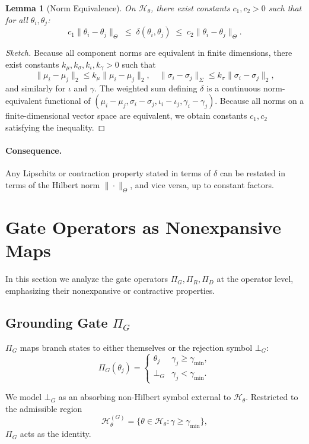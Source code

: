 \documentclass[11pt, a4paper]{article}
\newtheorem{lemma}[theorem]{Lemma}
\begin{document}
\begin{lemma}[Norm Equivalence]
On $\mathcal{H}_\theta$, there exist constants $c_1,c_2 > 0$ such that for all $\theta_i,\theta_j$:
\[
c_1 \|\theta_i-\theta_j\|_{\Theta}
\;\le\;
\delta(\theta_i,\theta_j)
\;\le\;
c_2 \|\theta_i-\theta_j\|_{\Theta}.
\]
\end{lemma}

\begin{proof}[Sketch]
Because all component norms are equivalent in finite dimensions, there exist constants $k_\mu,k_\sigma,k_\iota,k_\gamma > 0$ such that
\[
\|\mu_i-\mu_j\|_2 \le k_\mu \|\mu_i-\mu_j\|_2,\quad
\|\sigma_i-\sigma_j\|_{\Sigma} \le k_\sigma \|\sigma_i-\sigma_j\|_2,
\]
and similarly for $\iota$ and $\gamma$.
The weighted sum defining $\delta$ is a continuous norm-equivalent functional of $(\mu_i-\mu_j,\sigma_i-\sigma_j,\iota_i-\iota_j,\gamma_i-\gamma_j)$.
Because all norms on a finite-dimensional vector space are equivalent, we obtain constants $c_1,c_2$ satisfying the inequality.
\end{proof}

\paragraph{Consequence.}
Any Lipschitz or contraction property stated in terms of $\delta$ can be restated in terms of the Hilbert norm $\|\cdot\|_{\Theta}$, and vice versa, up to constant factors.

\section{Gate Operators as Nonexpansive Maps}

In this section we analyze the gate operators $\Pi_G,\Pi_R,\Pi_D$ at the operator level, emphasizing their nonexpansive or contractive properties.

\subsection{Grounding Gate $\Pi_G$}

$\Pi_G$ maps branch states to either themselves or the rejection symbol $\bot_G$:
\[
\Pi_G(\theta_j) =
\begin{cases}
\theta_j & \gamma_j \ge \gamma_{\min},\\[2pt]
\bot_G   & \gamma_j < \gamma_{\min}.
\end{cases}
\]

We model $\bot_G$ as an absorbing non-Hilbert symbol external to $\mathcal{H}_\theta$.
Restricted to the admissible region
\[
\mathcal{H}_\theta^{(G)} = \{\theta \in \mathcal{H}_\theta : \gamma \ge \gamma_{\min}\},
\]
$\Pi_G$ acts as the identity.
\end{document}
